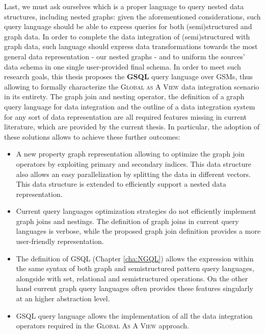 Last, we must ask ourselves which is a proper language to query nested data structures, including nested graphs: given the aforementioned considerations, such query language should be able to  express queries for both (semi)structured and graph data. In order to complete the data integration of (semi)structured with graph data, such language should  express  data transformations  towards the most general data representation - our nested graphs - and to uniform the sources' data schema in one single user-provided final schema. In order to meet such research goals, this thesis proposes the \textbf{GSQL} query language over GSMs, thus allowing to formally characterize the \textsc{Global as A View} data integration scenario in its entirety. The graph join and nesting operator, the definition of a graph query language for data integration and the outline of a data integration system for any sort of data representation are all required features missing in current literature, which are provided by the current thesis. In particular, the adoption of these solutions allows to achieve these further outcomes:
\begin{itemize}
	\item A new property graph representation allowing to optimize the graph join operators by exploiting primary and secondary indices. This data structure also allows an easy parallelization by splitting the data in different vectors. This data structure is extended to efficiently support a nested data representation.
	\item Current  query languages optimization strategies do not  efficiently implement  graph joins and nestings. The definition of graph joins in current query languages is  verbose, while the proposed graph join definition provides a more user-friendly representation.
	\item The definition of GSQL (Chapter \vref{cha:NGQL}) allows the expression within the same syntax of both graph and semistructured pattern query languages, alongside with set, relational and semistructured operations. On the other hand current graph query languages often provides these features singularly at an higher abstraction level.
	\item GSQL query language allows the implementation of all the data integration operators required in the \textsc{Global As A View} approach.
\end{itemize}


